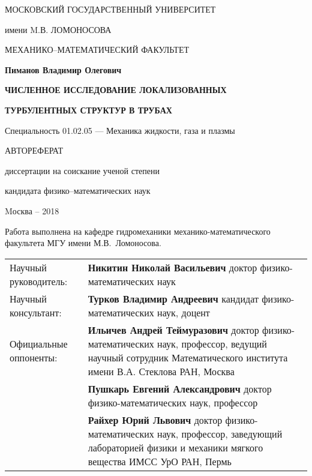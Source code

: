 \documentclass[a4paper,14pt,
oneside]{extbook}
\begin{document}
 \sloppy

\thispagestyle{empty}
\centerline{МОСКОВСКИЙ ГОСУДАРСТВЕННЫЙ УНИВЕРСИТЕТ}
\centerline{имени M.В. ЛОМОНОСОВА}
\centerline{МЕХАНИКО--МАТЕМАТИЧЕСКИЙ ФАКУЛЬТЕТ}

\vfill

\vfill
\vfill

\centerline{\bf Пиманов Владимир Олегович} \vfill
\centerline{\bf ЧИСЛЕННОЕ ИССЛЕДОВАНИЕ ЛОКАЛИЗОВАННЫХ}
\centerline{\bf ТУРБУЛЕНТНЫХ СТРУКТУР В ТРУБАХ}
 \centerline{\bf}
 \centerline{\bf }
\centerline{Специальность 01.02.05
--- Механика жидкости, газа и плазмы} 
\vfill \vfill
\centerline{АВТОРЕФЕРАТ}
\centerline{диссертации на соискание ученой степени} 
\centerline{кандидата физико--математических наук} 
\vfill \vfill \vfill \vfill 
\centerline{Mосква -- 2018}
\normalsize


\newcommand{\vsp}{\vspace{0.25cm}}

\newpage
{}
\thispagestyle{empty} \noindent Работа выполнена на кафедре гидромеханики механико-математического факультета МГУ имени М.В.~Ломоносова.

\vsp

\noindent \begin{tabular}{@{}p{5.8cm}p{11.3cm}@{}}
Научный руководитель: & \textbf{Никитин Николай Васильевич}
доктор физико-математических наук\vsp \\
Научный консультант: & \textbf{Турков Владимир Андреевич}
кандидат физико-математических наук, доцент\vsp \\
Официальные оппоненты: & \textbf{Ильичев Андрей Теймуразович}
доктор физико-математических наук, профессор,
ведущий научный сотрудник Математического
института имени В.А. Стеклова РАН, Москва\vsp\\
&
\textbf{Пушкарь Евгений Александрович}
доктор физико-математических наук, профессор\vsp\\
&
\textbf{Райхер Юрий Львович}
доктор физико-математических наук, профессор,
заведующий лабораторией физики и механики
мягкого вещества ИМСС УрО РАН, Пермь\vsp\\
\end{tabular}
\vspace{1mm}
\end{document}
